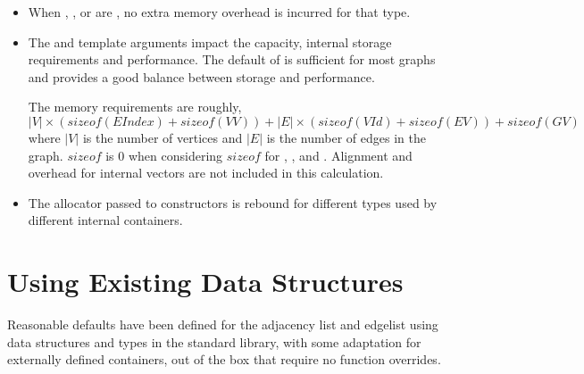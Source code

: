 \begin{itemdescr}
    \pnum\effects
        \begin{itemize}
            \item When , , or  are , no extra memory overhead is incurred for that type.
         \end{itemize}
    \pnum\remarks 
        \begin{itemize}
            \item  The  and  template arguments impact the capacity, internal storage requirements and performance.
                   The default of  is sufficient for most graphs and provides a good balance between storage and performance.

                   The memory requirements are roughly, 
                        \[|V| \times (sizeof(EIndex)+sizeof(VV)) + |E| \times (sizeof(VId) + sizeof(EV)) + sizeof(GV)\]
                   where $|V|$ is the number of vertices and $|E|$ is the number of edges in the graph. $sizeof$  is 0
                   when considering $sizeof$ for , , and . Alignment and overhead for internal vectors are 
                   not included in this calculation.
            \item The allocator passed to constructors is rebound for different types used by different internal containers.
        \end{itemize}
\end{itemdescr}

\section{Using Existing Data Structures}


Reasonable defaults have been defined for the adjacency list and edgelist using data structures and types
in the standard library, with some adaptation for externally defined containers, out of the box that require
no function overrides.

